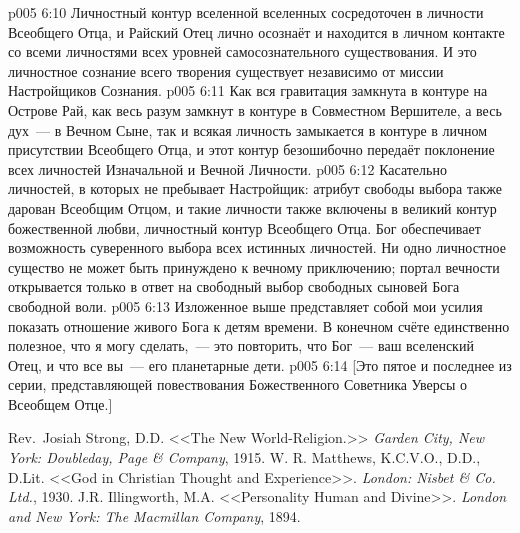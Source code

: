 \vs p005 6:10 \pc Личностный контур вселенной вселенных сосредоточен в личности Всеобщего Отца, и Райский Отец лично осознаёт и находится в личном контакте со всеми личностями всех уровней самосознательного существования. И это личностное сознание всего творения существует независимо от миссии Настройщиков Сознания.
\vs p005 6:11 \pc Как вся гравитация замкнута в контуре на Острове Рай, как весь разум замкнут в контуре в Совместном Вершителе, а весь дух~--- в Вечном Сыне, так и всякая личность замыкается в контуре в личном присутствии Всеобщего Отца, и этот контур безошибочно передаёт поклонение всех личностей Изначальной и Вечной Личности.
\vs p005 6:12 \pc Касательно личностей, в которых не пребывает Настройщик: атрибут свободы выбора также дарован Всеобщим Отцом, и такие личности также включены в великий контур божественной любви, личностный контур Всеобщего Отца. Бог обеспечивает возможность суверенного выбора всех истинных личностей. Ни одно личностное существо не может быть принуждено к вечному приключению; портал вечности открывается только в ответ на свободный выбор свободных сыновей Бога свободной воли.
\vs p005 6:13 \pc Изложенное выше представляет собой мои усилия показать отношение живого Бога к детям времени. В конечном счёте единственно полезное, что я могу сделать,~--- это повторить, что Бог~--- ваш вселенский Отец, и что все вы~--- его планетарные дети.
\vsetoff
\vs p005 6:14 [Это пятое и последнее из серии, представляющей повествования Божественного Советника Уверсы о Всеобщем Отце.]
\quizlink
\begin{thebibliography}{100}
Rev.~Josiah Strong, D.D.
{<<The New World\hyp{}Religion.>>}
{\em Garden City, New York: Doubleday, Page \& Company}, 1915.
W. R. Matthews, K.C.V.O., D.D., D.Lit.
{<<God in Christian Thought and Experience>>.}
{\em London: Nisbet \& Co. Ltd.}, 1930.
J.R. Illingworth, M.A.
{<<Personality Human and Divine>>.}
{\em London and New York: The Macmillan Company}, 1894.
\end{thebibliography}
